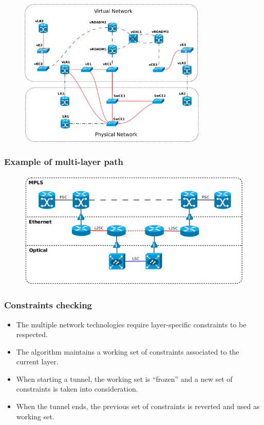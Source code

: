 \documentclass{beamer}
\begin{document}
\frame
{
  \begin{figure}[!htbp]
    \begin{center}
      \includegraphics[width=0.8\textwidth]{img/testbed_model}
    \end{center}
  \end{figure}
}
\frame
{
  \frametitle{Example of multi-layer path}

  \begin{figure}[!htbp]
    \begin{center}
      \includegraphics[width=1\textwidth]{img/multi_path2}
    \end{center}
  \end{figure}
}
\frame
{
  \frametitle{Constraints checking}

  \begin{itemize}
  \item The multiple network technologies require layer-specific
    constraints to be respected.
  \item The algorithm maintains a working set of constraints
    associated to the current layer.
  \item When starting a tunnel, the working set is ``frozen'' and a
    new set of constraints is taken into consideration.
  \item When the tunnel ends, the previous set of constraints is
    reverted and used as working set.
  \end{itemize}
}
\end{document}
